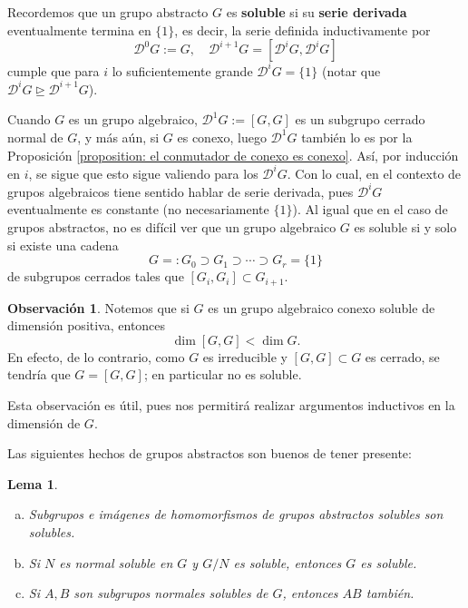\documentclass[spanish,12pt]{amsart}
\newtheorem{lemma}[theorem]{Lema}
\theoremstyle{definition}
\newtheorem{obs}[theorem]{Observación}
\theoremstyle{remark}
\numberwithin{equation}{section}
\begin{document}
Recordemos que un grupo abstracto $G$ es \textbf{soluble} si su \textbf{serie derivada} eventualmente termina en $\{1\}$, es decir, la serie definida inductivamente por
\[
    \mathcal D ^0 G :=G, \quad \mathcal D^{i + 1} G = [\mathcal D ^i G, \mathcal D^i G]
\]
cumple que para $i$ lo suficientemente grande $\mathcal D^i G = \{1\}$ (notar que $\mathcal D ^i G \unrhd \mathcal D^{i + 1} G$).

Cuando $G$ es un grupo algebraico, $\mathcal D^1 G := [G,G]$ es un subgrupo cerrado normal de $G$, y más aún, si $G$ es conexo, luego $\mathcal D^1 G$ también lo es por la Proposición \ref{proposition: el conmutador de conexo es conexo}. Así, por inducción en $i$, se sigue que esto sigue valiendo para los $\mathcal D^i G$. Con lo cual, en el contexto de grupos algebraicos tiene sentido hablar de serie derivada, pues $\mathcal D^i G$ eventualmente es constante (no necesariamente $\{1\}$). Al igual que en el caso de grupos abstractos, no es difícil ver que un grupo algebraico $G$ es soluble si y solo si existe una cadena
\[
    G =: G_0 \supset G_1 \supset \cdots \supset G_r = \{1\}
\]
de subgrupos cerrados tales que $[G_i,G_i] \subset G_{i+1}$.

\begin{obs}\label{obs:si es soluble y conexo la dimension del conmutador baja}
Notemos que si $G$ es un grupo algebraico conexo soluble de dimensión positiva, entonces
\[
    \dim [G,G] < \dim G.
\]
En efecto, de lo contrario, como $G$ es irreducible y $[G,G] \subset G$ es cerrado, se tendría que $G = [G,G]$; en particular no es soluble.
\end{obs}
Esta observación es útil, pues nos permitirá realizar argumentos inductivos en la dimensión de $G$.

Las siguientes hechos de grupos abstractos son buenos de tener presente:
\begin{lemma}
\begin{enumerate}[(a)]
\item Subgrupos e imágenes de homomorfismos de grupos abstractos solubles son solubles.
\item Si $N$ es normal soluble en $G$ y $G/N$ es soluble, entonces $G$ es soluble.
\item Si $A,B$ son subgrupos normales solubles de $G$, entonces $AB$ también.
\end{enumerate}
\end{lemma}
\end{document}
